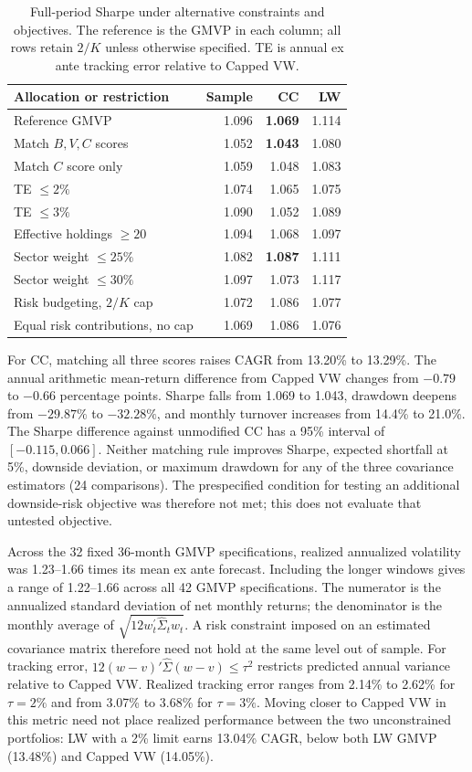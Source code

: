 \documentclass[letterpaper,journal]{IEEEtran}
\begin{document}
\begin{table}[!t]\centering
\caption{Full-period Sharpe under alternative constraints and objectives. The reference is the GMVP in each column; all rows retain $2/K$ unless otherwise specified. TE is annual ex ante tracking error relative to Capped VW.}\label{tab:extconstraints}
\small\setlength{\tabcolsep}{4pt}\begin{tabular}{lrrr}\toprule
Allocation or restriction & Sample & CC & LW\\\midrule
Reference GMVP & 1.096 & \textbf{1.069} & 1.114\\
Match $B,V,C$ scores & 1.052 & \textbf{1.043} & 1.080\\
Match $C$ score only & 1.059 & 1.048 & 1.083\\
TE $\leq2\%$ & 1.074 & 1.065 & 1.075\\
TE $\leq3\%$ & 1.090 & 1.052 & 1.089\\
Effective holdings $\geq20$ & 1.094 & 1.068 & 1.097\\
Sector weight $\leq25\%$ & 1.082 & \textbf{1.087} & 1.111\\
Sector weight $\leq30\%$ & 1.097 & 1.073 & 1.117\\\midrule
Risk budgeting, $2/K$ cap & 1.072 & 1.086 & 1.077\\
Equal risk contributions, no cap & 1.069 & 1.086 & 1.076\\
\bottomrule\end{tabular}\end{table}

For CC, matching all three scores raises CAGR from 13.20\% to 13.29\%. The annual arithmetic mean-return difference from Capped VW changes from $-0.79$ to $-0.66$ percentage points. Sharpe falls from 1.069 to 1.043, drawdown deepens from $-29.87\%$ to $-32.28\%$, and monthly turnover increases from 14.4\% to 21.0\%. The Sharpe difference against unmodified CC has a 95\% interval of $[-0.115,0.066]$. Neither matching rule improves Sharpe, expected shortfall at 5\%, downside deviation, or maximum drawdown for any of the three covariance estimators (24 comparisons). The prespecified condition for testing an additional downside-risk objective was therefore not met; this does not evaluate that untested objective.

Across the 32 fixed 36-month GMVP specifications, realized annualized volatility was 1.23--1.66 times its mean ex ante forecast. Including the longer windows gives a range of 1.22--1.66 across all 42 GMVP specifications. The numerator is the annualized standard deviation of net monthly returns; the denominator is the monthly average of $\sqrt{12 w_t^\prime\widehat\Sigma_t w_t}$. A risk constraint imposed on an estimated covariance matrix therefore need not hold at the same level out of sample. For tracking error, $12(w-v)'\widehat\Sigma(w-v)\leq\tau^2$ restricts predicted annual variance relative to Capped VW. Realized tracking error ranges from 2.14\% to 2.62\% for $\tau=2\%$ and from 3.07\% to 3.68\% for $\tau=3\%$. Moving closer to Capped VW in this metric need not place realized performance between the two unconstrained portfolios: LW with a 2\% limit earns 13.04\% CAGR, below both LW GMVP (13.48\%) and Capped VW (14.05\%).
\end{document}
